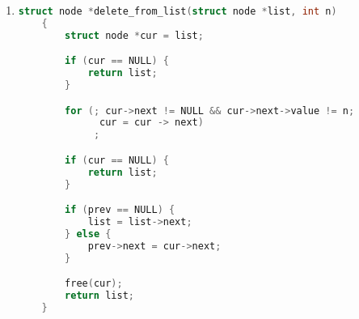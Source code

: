 \documentclass[12pt]{article}
\begin{document}
\begin{enumerate}[1.]
    \item

\begin{lstlisting}[language=c]
    struct node *delete_from_list(struct node *list, int n)
    {
        struct node *cur = list;

        if (cur == NULL) {
            return list;
        }

        for (; cur->next != NULL && cur->next->value != n;
              cur = cur -> next)
             ;

        if (cur == NULL) {
            return list;
        }

        if (prev == NULL) {
            list = list->next;
        } else {
            prev->next = cur->next;
        }

        free(cur);
        return list;
    }
\end{lstlisting}


\end{enumerate}
\end{document}
